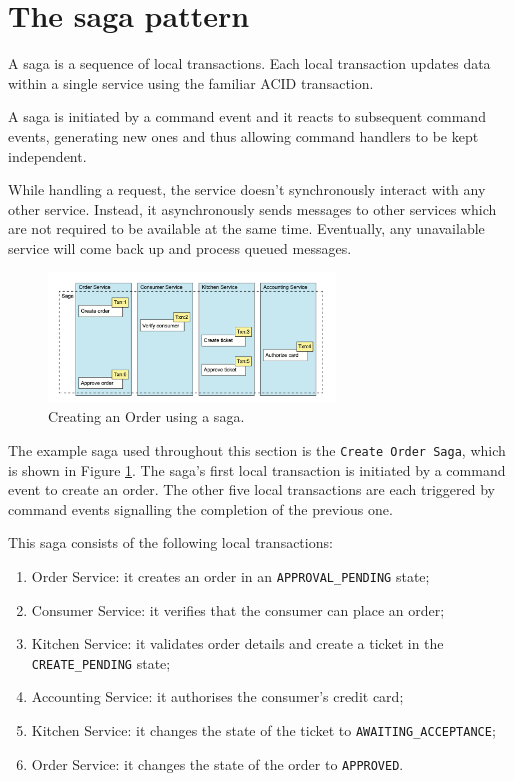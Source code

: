 \documentclass[conference]{IEEEtran}
\begin{document}
\section{The saga pattern}

A saga is a sequence of local transactions. Each local transaction updates data within a single service using the familiar ACID transaction.

A saga is initiated by a command event and it reacts to subsequent command events, generating new ones and thus allowing command handlers to be kept independent.

While handling a request, the service doesn’t synchronously interact with any other service. Instead, it asynchronously sends messages to other services which are not required to be available at the same time. Eventually, any unavailable service will come back up and process queued messages.

\begin{figure}[!htbp]
\centering
\includegraphics[width=3in]{jpeg/order-saga}
\caption{Creating an Order using a saga. \cite{microservices-patterns-saga}}
\label{order_saga}
\end{figure}

The example saga used throughout this section is the \texttt{Create Order Saga}, which is shown in Figure \ref{order_saga}. The saga’s first local transaction is initiated by a command event to create an order. The other five local transactions are each triggered by command events signalling the completion of the previous one.

This saga consists of the following local transactions:

\begin{enumerate}
  \item Order Service: it creates an order in an \texttt{APPROVAL\_PENDING} state;
  \item Consumer Service: it verifies that the consumer can place an order;
  \item Kitchen Service: it validates order details and create a ticket in the \texttt{CREATE\_PENDING} state;
  \item Accounting Service: it authorises the consumer’s credit card;
  \item Kitchen Service: it changes the state of the ticket to \texttt{AWAITING\_ACCEPTANCE};
  \item Order Service: it changes the state of the order to \texttt{APPROVED}.
\end{enumerate}
\end{document}
